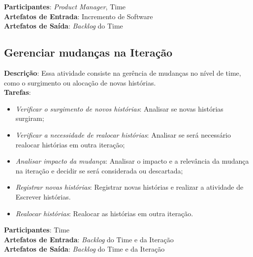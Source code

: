   \textbf{Participantes}: \textit{Product Manager}, Time\\

  \textbf{Artefatos de Entrada}: Incremento de Software \\

  \textbf{Artefatos de Saída}:   \textit{Backlog} do Time \\

\subsection{Gerenciar mudanças na Iteração}
  \textbf{Descrição}: Essa atividade consiste na gerência de mudanças no nível de time, como o surgimento ou alocação de novas histórias.\\

  \textbf{Tarefas}:
  \begin{itemize}
   \item \indent \textit{Verificar o surgimento de novos histórias}: Analisar se novas histórias surgiram;

   \item \indent \textit{Verificar a necessidade de realocar histórias}: Analisar se será necessário realocar histórias em outra iteração;
   
   \item \indent \textit{Analisar impacto da mudança}: Analisar o impacto e a relevância da mudança na iteração e decidir se será considerada
   ou descartada;

   \item \indent \textit{Registrar novas histórias}: Registrar novas histórias e realizar a atividade de Escrever histórias.

   \item \indent \textit{Realocar histórias}: Realocar as histórias em outra iteração.
  \end{itemize}

  \textbf{Participantes}: Time\\

  \textbf{Artefatos de Entrada}: \textit{Backlog} do Time e da Iteração\\

  \textbf{Artefatos de Saída}:  \textit{Backlog} do Time e da Iteração\\